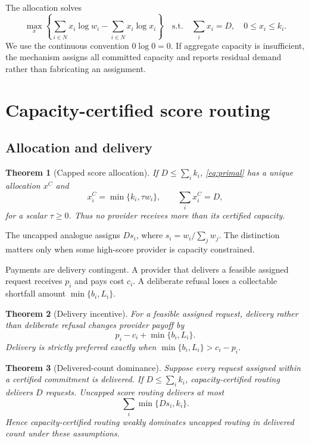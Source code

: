 \documentclass[11pt]{article}
\newtheorem{theorem}{Theorem}
\theoremstyle{definition}
\begin{document}
The allocation solves
\begin{equation}
\label{eq:primal}
 \max_x\left\{\sum_{i\in N}x_i\log w_i-\sum_{i\in N}x_i\log x_i\right\}
 \quad\text{s.t.}\quad
 \sum_i x_i=D,\quad 0\leq x_i\leq k_i.
\end{equation}
We use the continuous convention $0\log 0=0$. If aggregate capacity is
insufficient, the mechanism assigns all committed capacity and reports
residual demand rather than fabricating an assignment.

\section{Capacity-certified score routing}

\subsection{Allocation and delivery}

\begin{theorem}[Capped score allocation]
\label{thm:waterfill}
If $D\leq\sum_i k_i$, \cref{eq:primal} has a unique allocation $x^C$ and
\[
  x_i^C=\min\{k_i,\tau w_i\},\qquad \sum_i x_i^C=D,
\]
for a scalar $\tau\geq 0$. Thus no provider receives more than its certified
capacity.
\end{theorem}

The uncapped analogue assigns $Ds_i$, where
$s_i=w_i/\sum_j w_j$. The distinction matters only when some high-score
provider is capacity constrained.

Payments are delivery contingent. A provider that delivers a feasible assigned
request receives $p_i$ and pays cost $c_i$. A deliberate refusal loses a
collectable shortfall amount $\min\{b_i,L_i\}$.

\begin{theorem}[Delivery incentive]
\label{thm:delivery}
For a feasible assigned request, delivery rather than deliberate refusal
changes provider payoff by
\[
 p_i-c_i+\min\{b_i,L_i\}.
\]
Delivery is strictly preferred exactly when
$\min\{b_i,L_i\}>c_i-p_i$.
\end{theorem}

\begin{theorem}[Delivered-count dominance]
\label{thm:count}
Suppose every request assigned within a certified commitment is delivered. If
$D\leq\sum_i k_i$, capacity-certified routing delivers $D$ requests. Uncapped
score routing delivers at most
\[
  \sum_i\min\{Ds_i,k_i\}.
\]
Hence capacity-certified routing weakly dominates uncapped routing in delivered
count under these assumptions.
\end{theorem}
\end{document}
